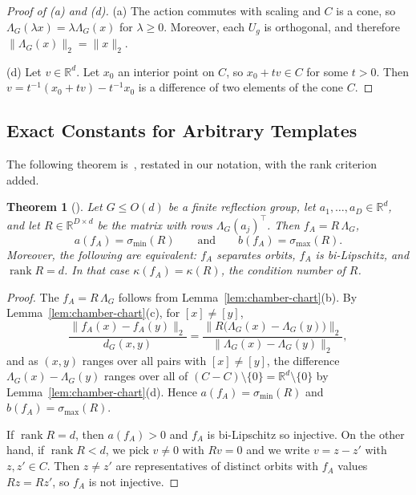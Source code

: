 \documentclass[11pt]{article}
\newcommand{\R}{\mathbb{R}}
\newtheorem{theor}{Theorem}[section]
\theoremstyle{definition}
\begin{document}
\begin{proof}[Proof of (a) and (d)]
	(a) The action commutes with scaling and $C$ is a cone, so
	$\Lambda_G(\lambda x)=\lambda\Lambda_G(x)$ for $\lambda\ge0$. Moreover, each $U_g$ is
	orthogonal, and therefore $\|\Lambda_G(x)\|_2=\|x\|_2$.

	(d) Let $v\in\R^d$. Let $x_0$ an interior point on $C$,	so $x_0+tv\in C$ for some $t>0$. Then $v=t^{-1}(x_0+tv)-t^{-1}x_0$ is a difference
	of two elements of the cone $C$.
\end{proof}

\subsection{Exact Constants for Arbitrary Templates}

The following theorem is~\cite[Lem.~9]{mixonpacker}, restated in
our notation, with the rank criterion added.

\begin{theor}[{\cite[Lem.~9]{mixonpacker}}]
	\label{thm:reflection-constants}
	Let $G\le O(d)$ be a finite reflection group, let $a_1,\dots,a_D\in\R^d$,
	and let $R\in\R^{D\times d}$ be the matrix with rows
	$\Lambda_G(a_j)^{\!\top}$. Then $f_A=R\,\Lambda_G$,
	\[
	a(f_A)=\sigma_{\min}(R)\qquad\text{and}\qquad
	b(f_A)=\sigma_{\max}(R).
	\]
	Moreover, the following are equivalent: $f_A$ separates orbits, $f_A$ is
	bi-Lipschitz, and $\operatorname{rank}R=d$. In that case
	$\kappa(f_A)=\kappa(R)$, the condition number of $R$.
\end{theor}

\begin{proof}
	The $f_A=R\,\Lambda_G$ follows from Lemma~\ref{lem:chamber-chart}(b). By
	Lemma~\ref{lem:chamber-chart}(c), for $[x]\neq[y]$,
	\[
	\frac{\|f_A(x)-f_A(y)\|_2}{d_G(x,y)}
	=\frac{\bigl\|R\bigl(\Lambda_G(x)-\Lambda_G(y)\bigr)\bigr\|_2}
	{\bigl\|\Lambda_G(x)-\Lambda_G(y)\bigr\|_2},
	\]
	and as $(x,y)$ ranges over all pairs with $[x]\neq[y]$, the difference
	$\Lambda_G(x)-\Lambda_G(y)$ ranges over all of
	$(C-C)\setminus\{0\}=\R^d\setminus\{0\}$ by
	Lemma~\ref{lem:chamber-chart}(d). Hence $a(f_A)=\sigma_{\min}(R)$ and
	$b(f_A)=\sigma_{\max}(R)$.

	If $\operatorname{rank}R=d$, then $a(f_A)>0$ and $f_A$ is bi-Lipschitz so injective. On the other hand, if $\operatorname{rank}R<d$, we pick $v\neq0$ with $Rv=0$ and we write
	$v=z-z'$ with $z,z'\in C$. Then $z\neq z'$ are representatives of distinct
	orbits with $f_A$ values $Rz=Rz'$, so $f_A$ is not injective.
\end{proof}
\end{document}
